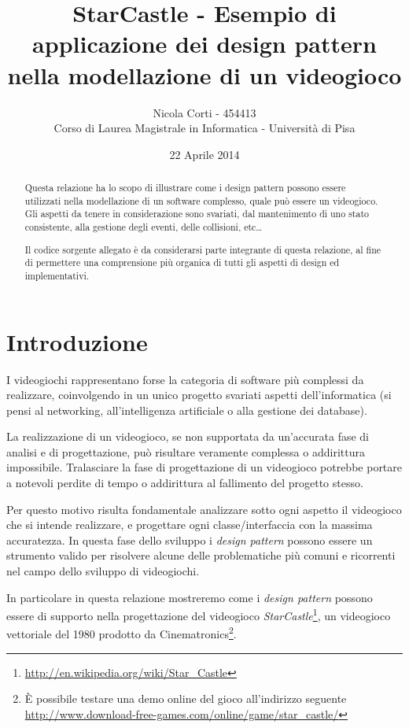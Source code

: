 \documentclass[a4paper,12pt]{article}
\title{StarCastle - Esempio di applicazione dei design pattern nella modellazione di un videogioco}
\author{Nicola Corti - 454413 \\Corso di Laurea Magistrale in Informatica - Universit\`a di Pisa}
\date{22 Aprile 2014}
\begin{document}
\maketitle

\begin{abstract}
Questa relazione ha lo scopo di illustrare come i design pattern possono essere utilizzati nella modellazione di un software complesso, quale pu\`o essere un videogioco. Gli aspetti da tenere in considerazione sono svariati, dal mantenimento di uno stato consistente, alla gestione degli eventi, delle collisioni, etc\dots{}

Il codice sorgente allegato \`e da considerarsi parte integrante di questa relazione, al fine di permettere una comprensione pi\`u organica di tutti gli aspetti di design ed implementativi.
\end{abstract}

\tableofcontents
\newpage

\section*{Introduzione}
\label{sec:introduzione}

I videogiochi rappresentano forse la categoria di software pi\`u complessi da realizzare, coinvolgendo in un unico progetto svariati aspetti dell'informatica (si pensi al networking, all'intelligenza artificiale o alla gestione dei database).

La realizzazione di un videogioco, se non supportata da un'accurata fase di analisi e di progettazione, pu\`o risultare veramente complessa o addirittura impossibile. Tralasciare la fase di progettazione di un videogioco potrebbe portare a notevoli perdite di tempo o addirittura al fallimento del progetto stesso.

Per questo motivo risulta fondamentale analizzare sotto ogni aspetto il videogioco che si intende realizzare, e progettare ogni classe/interfaccia con la massima accuratezza. In questa fase dello sviluppo i \emph{design pattern} possono essere un strumento valido per risolvere alcune delle problematiche pi\`u comuni e ricorrenti nel campo dello sviluppo di videogiochi.

In particolare in questa relazione mostreremo come i \emph{design pattern} possono essere di supporto nella progettazione del videogioco \emph{StarCastle}\footnote{\url{http://en.wikipedia.org/wiki/Star_Castle}}, un videogioco vettoriale del 1980 prodotto da Cinematronics\footnote{\`E possibile testare una demo online del gioco all'indirizzo seguente \\ \url{http://www.download-free-games.com/online/game/star_castle/}}.
\end{document}

